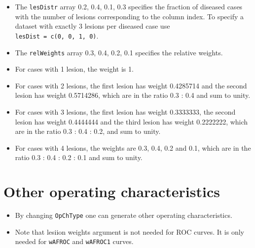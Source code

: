 \documentclass[
]{book}
\newenvironment{Shaded}{\begin{snugshade}}{\end{snugshade}}
\newcommand{\DataTypeTok}[1]{\textcolor[rgb]{0.13,0.29,0.53}{#1}}
\newcommand{\DecValTok}[1]{\textcolor[rgb]{0.00,0.00,0.81}{#1}}
\newcommand{\FloatTok}[1]{\textcolor[rgb]{0.00,0.00,0.81}{#1}}
\newcommand{\KeywordTok}[1]{\textcolor[rgb]{0.13,0.29,0.53}{\textbf{#1}}}
\newcommand{\NormalTok}[1]{#1}
\newcommand{\OperatorTok}[1]{\textcolor[rgb]{0.81,0.36,0.00}{\textbf{#1}}}
\newcommand{\StringTok}[1]{\textcolor[rgb]{0.31,0.60,0.02}{#1}}
\providecommand{\tightlist}{%
  \setlength{\itemsep}{0pt}\setlength{\parskip}{0pt}}
\begin{document}
\begin{itemize}
\tightlist
\item
  The \texttt{lesDistr} array 0.2, 0.4, 0.1, 0.3 specifies the fraction of diseased cases with the number of lesions corresponding to the column index. To specify a dataset with exactly 3 lesions per diseased case use \texttt{lesDist\ =\ c(0,\ 0,\ 1,\ 0)}.
\item
  The \texttt{relWeights} array 0.3, 0.4, 0.2, 0.1 specifies the relative weights.
\item
  For cases with 1 lesion, the weight is 1.
\item
  For cases with 2 lesions, the first lesion has weight 0.4285714 and the second lesion has weight 0.5714286, which are in the ratio 0.3 : 0.4 and sum to unity.
\item
  For cases with 3 lesions, the first lesion has weight 0.3333333, the second lesion has weight 0.4444444 and the third lesion has weight 0.2222222, which are in the ratio 0.3 : 0.4 : 0.2, and sum to unity.
\item
  For cases with 4 lesions, the weights are 0.3, 0.4, 0.2 and 0.1, which are in the ratio 0.3 : 0.4 : 0.2 : 0.1 and sum to unity.
\end{itemize}

\hypertarget{other-operating-characteristics}{%
\section{Other operating characteristics}\label{other-operating-characteristics}}

\begin{itemize}
\tightlist
\item
  By changing \texttt{OpChType} one can generate other operating characteristics.
\item
  Note that lesiion weights argument is not needed for ROC curves. It is only needed for \texttt{wAFROC} and \texttt{wAFROC1} curves.
\end{itemize}

\begin{Shaded}
\end{Shaded}
\end{document}
